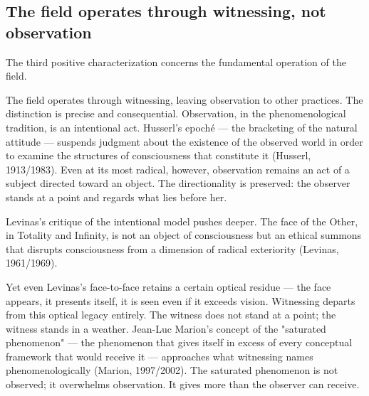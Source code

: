 \subsection{The field operates through witnessing, not observation}

The third positive characterization concerns the fundamental operation of the field.

The field operates through witnessing, leaving observation to other practices. The distinction is precise and consequential. Observation, in the phenomenological tradition, is an intentional act. Husserl's epoché — the bracketing of the natural attitude — suspends judgment about the existence of the observed world in order to examine the structures of consciousness that constitute it (Husserl, 1913/1983). Even at its most radical, however, observation remains an act of a subject directed toward an object. The directionality is preserved: the observer stands at a point and regards what lies before her.

Levinas's critique of the intentional model pushes deeper. The face of the Other, in Totality and Infinity, is not an object of consciousness but an ethical summons that disrupts consciousness from a dimension of radical exteriority (Levinas, 1961/1969).

Yet even Levinas's face-to-face retains a certain optical residue — the face appears, it presents itself, it is seen even if it exceeds vision. Witnessing departs from this optical legacy entirely. The witness does not stand at a point; the witness stands in a weather. Jean-Luc Marion's concept of the "saturated phenomenon" — the phenomenon that gives itself in excess of every conceptual framework that would receive it — approaches what witnessing names phenomenologically (Marion, 1997/2002). The saturated phenomenon is not observed; it overwhelms observation. It gives more than the observer can receive.

